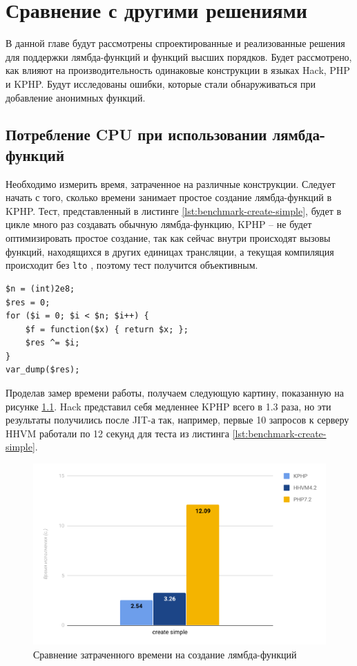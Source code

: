 
\chapter{Сравнение с другими решениями}
\label{sec:comparision}
В данной главе будут рассмотрены спроектированные и реализованные решения для поддержки лямбда-функций и функций высших порядков.
Будет рассмотрено, как влияют на производительность одинаковые конструкции в языках Hack, PHP и KPHP.
Будут исследованы ошибки, которые стали обнаруживаться при добавление анонимных функций.

\section{Потребление CPU при использовании лямбда-функций}
Необходимо измерить время, затраченное на различные конструкции.
Следует начать с того, сколько времени занимает простое создание лямбда-функций в KPHP.
Тест, представленный в листинге \ref{lst:benchmark-create-simple}, будет в цикле много раз создавать обычную лямбда-функцию, KPHP -- не будет оптимизировать простое создание, так как сейчас внутри происходят вызовы функций, находящихся в других единицах трансляции, а текущая компиляция происходит без \verb|lto| \cite{lto}, поэтому тест получится объективным.
\begin{lstlisting}[caption={Бенчмарк создания анонимных функций},label={lst:benchmark-create-simple}]
$n = (int)2e8;
$res = 0;
for ($i = 0; $i < $n; $i++) {
    $f = function($x) { return $x; };
    $res ^= $i;
}
var_dump($res);
\end{lstlisting}

Проделав замер времени работы, получаем следующую картину, показанную на рисунке \ref{fig:benchmark-create-simple}.
Hack представил себя медленнее KPHP всего в 1.3 раза, но эти результаты получились после JIT-а так, например, первые 10 запросов к серверу HHVM работали по 12 секунд для теста из листинга \ref{lst:benchmark-create-simple}.
\begin{figure}[H]
    \caption{Сравнение затраченного времени на создание лямбда-функций}
    \label{fig:benchmark-create-simple}
    \centering
    \includegraphics[width=\linewidth]{images/benchmark_create_simple}
\end{figure}


